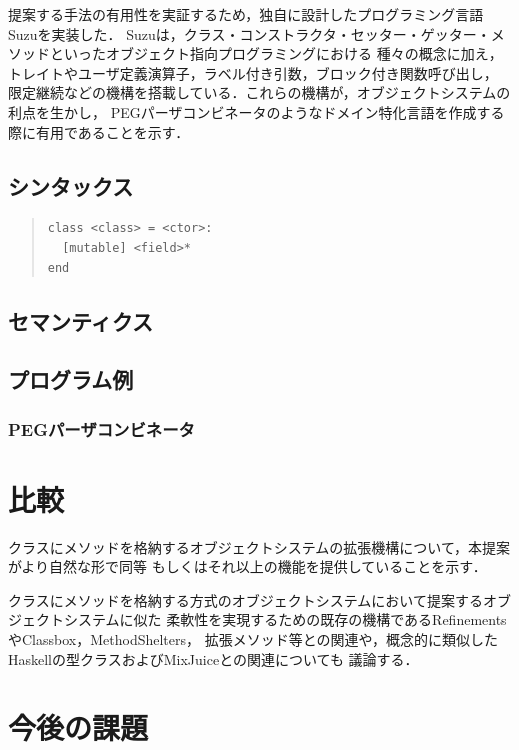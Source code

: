 \documentclass[withpage]{ipsjprosym}  %
\begin{document}
提案する手法の有用性を実証するため，独自に設計したプログラミング言語Suzuを実装した．
Suzuは，クラス・コンストラクタ・セッター・ゲッター・メソッドといったオブジェクト指向プログラミングにおける
種々の概念に加え，トレイトやユーザ定義演算子，ラベル付き引数，ブロック付き関数呼び出し，
限定継続などの機構を搭載している．これらの機構が，オブジェクトシステムの利点を生かし，
PEGパーザコンビネータのようなドメイン特化言語を作成する際に有用であることを示す．

\subsection{シンタックス}

\begin{quote}
\small
\begin{verbatim}
class <class> = <ctor>:
  [mutable] <field>*
end
\end{verbatim}
\end{quote}

\subsection{セマンティクス}

\subsection{プログラム例}

\subsubsection{PEGパーザコンビネータ}

\section{比較}

クラスにメソッドを格納するオブジェクトシステムの拡張機構について，本提案がより自然な形で同等
もしくはそれ以上の機能を提供していることを示す．

クラスにメソッドを格納する方式のオブジェクトシステムにおいて提案するオブジェクトシステムに似た
柔軟性を実現するための既存の機構であるRefinementsやClassbox，MethodShelters，
拡張メソッド等との関連や，概念的に類似したHaskellの型クラスおよびMixJuiceとの関連についても
議論する．

\section{今後の課題}
\end{document}
